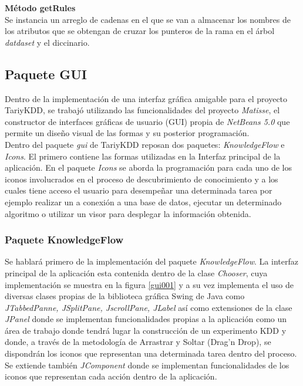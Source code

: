 \textbf{M\'etodo getRules}\\
Se instancia un arreglo de cadenas en el que se van a almacenar los nombres de los atributos que se obtengan de
cruzar los punteros de la rama en el \'arbol \textit{datdaset} y el diccinario.

\subsection{Paquete GUI}
Dentro de la implementaci\'on de una interfaz gr\'afica amigable para el proyecto TariyKDD, se trabaj\'o
utilizando las funcionalidades del proyecto \textit{Matisse},   el constructor de interfaces gr\'aficas de usuario
(GUI) propia de \textit{NetBeans 5.0}  que permite un dise\~no visual de las formas y su posterior
programaci\'on.\\

Dentro del paquete \textit{gui} de TariyKDD reposan dos paquetes:  \textit{KnowledgeFlow} e \textit{Icons}.  El
primero contiene las formas utilizadas en la Interfaz principal de la aplicaci\'on.  En el paquete \textit{Icons}
se aborda la programaci\'on para cada uno de los iconos involucrados en el proceso de descubrimiento de
conocimiento y a los cuales tiene acceso el usuario para desempe\~nar una determinada tarea por ejemplo realizar
un a conexi\'on a una base de datos, ejecutar un determinado algoritmo o utilizar un visor para desplegar la
informaci\'on obtenida.
\subsubsection{Paquete KnowledgeFlow}
Se hablar\'a primero de la implementaci\'on del paquete \textit{KnowledgeFlow}.  La interfaz principal de la
aplicaci\'on esta contenida dentro de la clase \textit{Chooser}, cuya implementaci\'on se muestra en la figura
\ref{gui001} y a su vez implementa el uso de diversas clases propias de la biblioteca gr\'afica Swing de Java como
\textit{JTabbedPanne, JSplitPane, JscrollPane, JLabel} as\'i como extensiones de la clase \textit{JPanel} donde se
implementan funcionalidades propias a la aplicaci\'on como un \'area de trabajo donde tendr\'a lugar la
construcci\'on de un experimento KDD y donde, a trav\'es de la metodolog\'ia de Arrastrar y Soltar (Drag'n Drop),
se dispondr\'an los iconos que representan una determinada tarea dentro del proceso.  Se extiende tambi\'en
\textit{JComponent} donde se implementan funcionalidades de los iconos que representan cada acci\'on dentro de la
aplicaci\'on.\\

